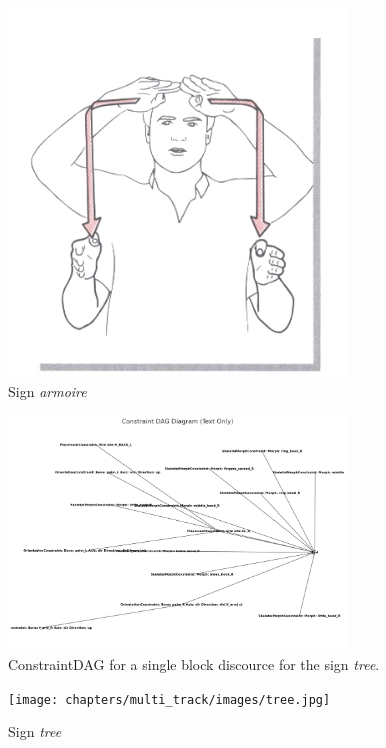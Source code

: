 \documentclass[../../main.tex]{subfiles}
\begin{document}
\begin{figure}
    \centering
    \includegraphics[width=0.8\textwidth]{chapters/multi_track/images/cupboard.jpg}
    \caption{Sign \emph{armoire}~\cite{moody97}}
    \label{fig:armoire_sign}
\end{figure}

\begin{figure}[h]
    \centering
    \includegraphics[width=0.8\textwidth]{chapters/multi_track/images/constraint_dag.png}
    \caption{ConstraintDAG for a single block discource for the sign \emph{tree}.}
    \label{fig:constraint_dag_tree}
\end{figure}

\begin{figure}
    \centering
    \texttt{[image: chapters/multi\_track/images/tree.jpg]}
    \caption{Sign \emph{tree}}
    \label{fig:tree_sign}
\end{figure}
\end{document}
